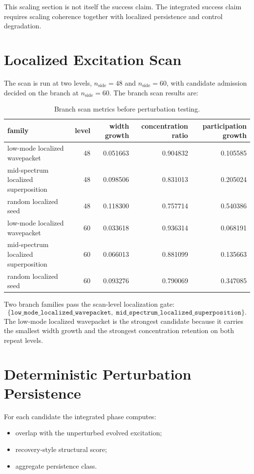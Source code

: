 \documentclass[11pt]{article}
\begin{document}
This scaling section is not itself the success claim. The integrated success claim requires scaling coherence together with localized persistence and control degradation.

\section{Localized Excitation Scan}

The scan is run at two levels, $n_{\mathrm{side}}=48$ and $n_{\mathrm{side}}=60$, with candidate admission decided on the branch at $n_{\mathrm{side}}=60$. The branch scan results are:

\begin{table}[t]
\centering
\small
\begin{tabular}{@{}lrrrr@{}}
\toprule
family & level & width growth & concentration ratio & participation growth \\
\midrule
low-mode localized wavepacket & 48 & 0.051663 & 0.904832 & 0.105585 \\
mid-spectrum localized superposition & 48 & 0.098506 & 0.831013 & 0.205024 \\
random localized seed & 48 & 0.118300 & 0.757714 & 0.540386 \\
low-mode localized wavepacket & 60 & 0.033618 & 0.936314 & 0.068191 \\
mid-spectrum localized superposition & 60 & 0.066013 & 0.881099 & 0.135663 \\
random localized seed & 60 & 0.093276 & 0.790069 & 0.347085 \\
\bottomrule
\end{tabular}
\caption{Branch scan metrics before perturbation testing.}
\label{tab:branch_scan}
\end{table}

Two branch families pass the scan-level localization gate:
\[
\{\texttt{low\_mode\_localized\_wavepacket},\;
\texttt{mid\_spectrum\_localized\_superposition}\}.
\]
The low-mode localized wavepacket is the strongest candidate because it carries the smallest width growth and the strongest concentration retention on both repeat levels.

\section{Deterministic Perturbation Persistence}

For each candidate the integrated phase computes:
\begin{itemize}
\item overlap with the unperturbed evolved excitation;
\item recovery-style structural score;
\item aggregate persistence class.
\end{itemize}
\end{document}
